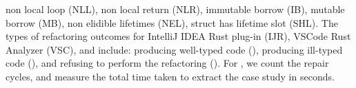 \begin{table}[]
{%
non local loop (NLL), non local return (NLR), immutable borrow (IB), mutable borrow (MB), non elidible lifetimes (NEL), struct has lifetime slot (SHL).
%
The types of refactoring outcomes for IntelliJ IDEA Rust plug-in (IJR), VSCode Rust Analyzer (VSC), and \tool include: 
%
producing well-typed code (\cmark), producing ill-typed code (\xmark), and refusing to perform the refactoring (\small{\Stopsign}).  
%
For \tool, we count the \cc repair cycles, and measure the total time taken to extract the case study in seconds.
%
}
\label{table:effoverall}
\end{table}
